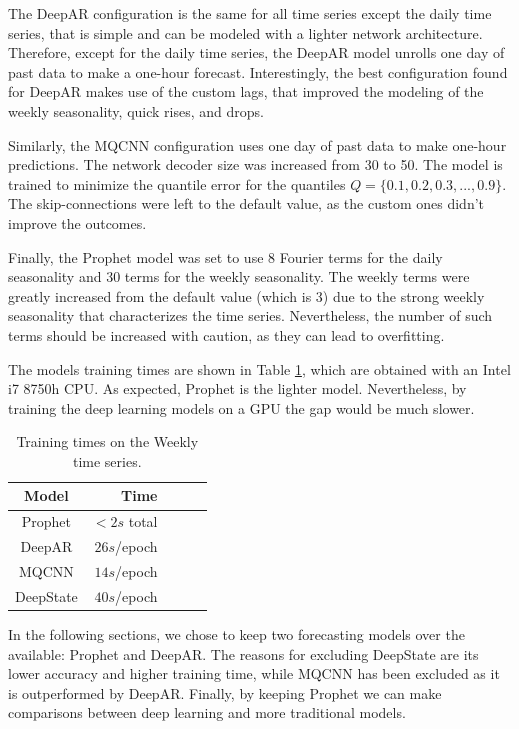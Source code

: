 \documentclass[a4paper, 12pt]{article} %
\newcommand{\ra}[1]{\renewcommand{\arraystretch}{#1}}
\begin{document}
	The DeepAR configuration is the same for all time series except the daily time series, that is simple and can be modeled with a lighter network architecture. Therefore, except for the daily time series, the DeepAR model unrolls one day of past data to make a one-hour forecast. Interestingly, the best configuration found for DeepAR makes use of the custom lags, that improved the modeling of the weekly seasonality, quick rises, and drops. 
	
	Similarly, the MQCNN configuration uses one day of past data to make one-hour predictions. The network decoder size was increased from 30 to 50. The model is trained to minimize the quantile error for the quantiles $Q = \{ 0.1, 0.2, 0.3, ..., 0.9\}$. The skip-connections were left to the default value, as the custom ones didn't improve the outcomes.
	
	Finally, the Prophet model was set to use 8 Fourier terms for the daily seasonality and 30 terms for the weekly seasonality. The weekly terms were greatly increased from the default value (which is 3) due to the strong weekly seasonality that characterizes the time series. Nevertheless, the number of such terms should be increased with caution, as they can lead to overfitting.
	
	The models training times are shown in Table \ref{table:results_forecasting_training_times}, which are obtained with an Intel i7 8750h CPU. As expected, Prophet is the lighter model. Nevertheless, by training the deep learning models on a GPU the gap would be much slower.
	
	\begin{table}\centering 
		\ra{1.3}
	\begin{tabular}{@{}crcrc@{}} 
		\midrule
		Model & Time\\
		\midrule
		Prophet & $<2s$ total\\
		DeepAR & $26s$/epoch\\
		MQCNN & $14s$/epoch\\
		DeepState & $40s$/epoch\\
		\bottomrule
	\end{tabular}
	\caption{Training times on the Weekly time series. } \label{table:results_forecasting_training_times}
\end{table}
	
	
	In the following sections, we chose to keep two forecasting models over the available: Prophet and DeepAR. The reasons for excluding DeepState are its lower accuracy and higher training time, while MQCNN has been excluded as it is outperformed by DeepAR. Finally, by keeping Prophet we can make comparisons between deep learning and more traditional models.	
	
\end{document}
